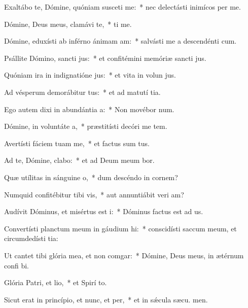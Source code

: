 \item Exaltábo te, Dómine, quóniam susceti me:~* nec delectásti inimícos  per me.
\item Dómine, Deus meus, clamávi  te,~*  ti me.
\item Dómine, eduxísti ab inférno ánimam am:~* salvásti me a descendénti  cum.
\item Psállite Dómino, sancti jus:~* et confitémini memóriæ sancti jus.
\item Quóniam ira in indignatióne jus:~* et vita in volun jus.
\item Ad vésperum demorábitur tus:~* et ad matutí tia.
\item Ego autem dixi in abundántia a:~* Non movébor  num.
\item Dómine, in voluntáte a,~* præstitísti decóri me tem.
\item Avertísti fáciem tuam  me,~* et factus sum tus.
\item Ad te, Dómine, clabo:~* et ad Deum meum bor.
\item Quæ utílitas in sánguine o,~* dum descéndo in cornem?
\item Numquid confitébitur tibi vis,~* aut annuntiábit veri am?
\item Audívit Dóminus, et misértus est i:~* Dóminus factus est ad us.
\item Convertísti planctum meum in gáudium hi:~* conscidísti saccum meum, et circumdedísti  tia:
\item Ut cantet tibi glória mea, et non comgar:~* Dómine, Deus meus, in ætérnum confi bi.
\item Glória Patri, et lio,~* et Spirí to.
\item Sicut erat in princípio, et nunc, et per,~* et in sǽcula sæcu. men.
